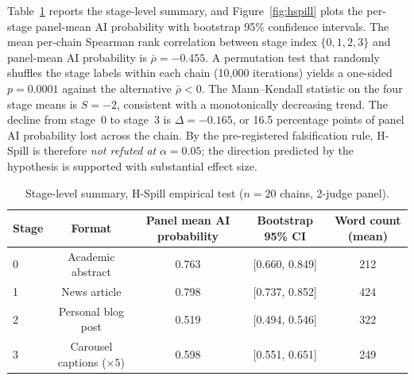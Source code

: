 \documentclass[12pt,a4paper]{article}
\begin{document}
Table~\ref{tab:hspill_stage_means} reports the stage-level summary, and Figure~\ref{fig:hspill} plots the per-stage panel-mean AI probability with bootstrap 95\% confidence intervals. The mean per-chain Spearman rank correlation between stage index $\{0,1,2,3\}$ and panel-mean AI probability is $\bar{\rho} = -0.455$. A permutation test that randomly shuffles the stage labels within each chain (10{,}000 iterations) yields a one-sided $p = 0.0001$ against the alternative $\bar{\rho} < 0$. The Mann--Kendall statistic on the four stage means is $S = -2$, consistent with a monotonically decreasing trend. The decline from stage~0 to stage~3 is $\Delta = -0.165$, or 16.5 percentage points of panel AI probability lost across the chain. By the pre-registered falsification rule, H-Spill is therefore \emph{not refuted at} $\alpha = 0.05$; the direction predicted by the hypothesis is supported with substantial effect size.

\begin{table}[H]
\centering
\caption{Stage-level summary, H-Spill empirical test ($n = 20$ chains, 2-judge panel).}
\label{tab:hspill_stage_means}
\small
\begin{tabular}{@{}l c c c c@{}}
\toprule
\textbf{Stage} & \textbf{Format} & \textbf{Panel mean AI probability} & \textbf{Bootstrap 95\% CI} & \textbf{Word count (mean)} \\
\midrule
0 & Academic abstract        & 0.763 & [0.660, 0.849] & 212 \\
1 & News article             & 0.798 & [0.737, 0.852] & 424 \\
2 & Personal blog post       & 0.519 & [0.494, 0.546] & 322 \\
3 & Carousel captions ($\times 5$) & 0.598 & [0.551, 0.651] & 249 \\
\bottomrule
\end{tabular}
\end{table}
\end{document}
